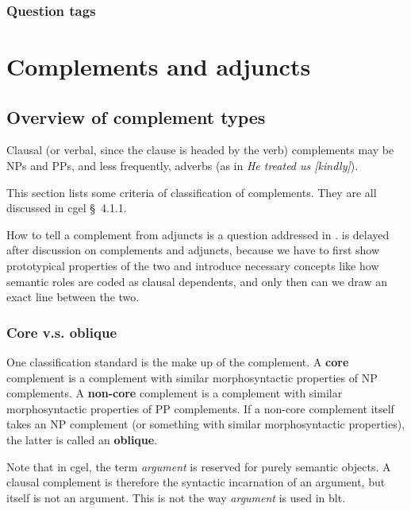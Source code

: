 \documentclass{article}
\newcommand*{\citesec}[1]{\S~{#1}}
\newcommand*{\concept}[1]{\textbf{#1}}
\newcommand*{\term}[1]{\emph{#1}}
\newcommand*{\corpus}[1]{\emph{#1}}
\begin{document}
\subsubsection{Question tags}\label{sec:question-tag}

\section{Complements and adjuncts}\label{sec:nucleus-dependents}

\subsection{Overview of complement types}\label{sec:types-of-complements}

Clausal (or verbal, since the clause is headed by the verb) complements 
may be NPs and PPs, and less frequently, adverbs 
(as in \corpus{He treated us [kindly]}). %

This section lists some criteria of classification of complements.
They are all discussed in \ac{cgel} \citesec{4.1.1}.


How to tell a complement from adjuncts is a question addressed in .
 is delayed after discussion on complements and adjuncts,
because we have to first show prototypical properties of the two 
and introduce necessary concepts like how semantic roles are coded as clausal dependents,
and only then can we draw an exact line between the two.

\subsubsection{Core v.s. oblique}\label{sec:core-oblique}

One classification standard is the make up of the complement.
A \concept{core} complement is a complement with similar morphosyntactic properties of NP complements.
A \concept{non-core} complement is a complement with similar morphosyntactic properties of PP complements.
If a non-core complement itself takes an NP complement (or something with similar morphosyntactic properties),
the latter is called an \concept{oblique}.

Note that in \ac{cgel}, the term \term{argument} is reserved for purely semantic objects.
A clausal complement is therefore the syntactic incarnation of an argument,
but itself is not an argument.
This is not the way \term{argument} is used in \ac{blt}.
\end{document}
